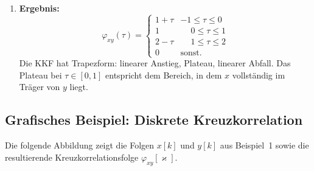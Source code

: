 \begin{beispiel}
\begin{enumerate}
  \item \textbf{Ergebnis:}
  $$
  \varphi_{xy}(\tau) = \begin{cases}
    1+\tau & -1 \leq \tau \leq 0 \\
    1      & \phantom{-}0 \leq \tau \leq 1 \\
    2-\tau & \phantom{-}1 \leq \tau \leq 2 \\
    0      & \text{sonst.}
  \end{cases}
  $$
  Die KKF hat Trapezform: linearer Anstieg, Plateau, linearer Abfall.
  Das Plateau bei $\tau \in [0,1]$ entspricht dem Bereich, in dem $x$ vollständig
  im Träger von $y$ liegt.
\end{enumerate}

\end{beispiel}

\newpage
\subsection*{Grafisches Beispiel: Diskrete Kreuzkorrelation}

Die folgende Abbildung zeigt die Folgen $x[k]$ und $y[k]$ aus Beispiel~1 sowie die resultierende Kreuzkorrelationsfolge $\varphi_{xy}[\varkappa]$.

